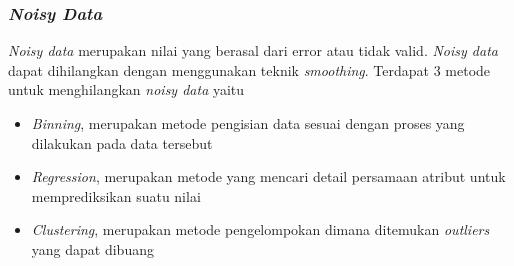 \subsubsection{\textsl{Noisy Data}}
\textsl{Noisy data} merupakan nilai yang berasal dari error atau tidak valid. \textsl{Noisy data} dapat dihilangkan dengan menggunakan teknik \textsl{smoothing}. Terdapat 3 metode untuk menghilangkan \textsl{noisy data} yaitu
	\label{teknikBinning}
	\begin{itemize}
		\item \textsl{Binning}, merupakan metode pengisian data sesuai dengan proses yang dilakukan pada data tersebut
		\item \textsl{Regression}, merupakan metode yang mencari detail persamaan atribut untuk memprediksikan suatu nilai
		\item	\textsl{Clustering}, merupakan metode pengelompokan dimana ditemukan \textsl{outliers} yang dapat dibuang
	\end{itemize}




